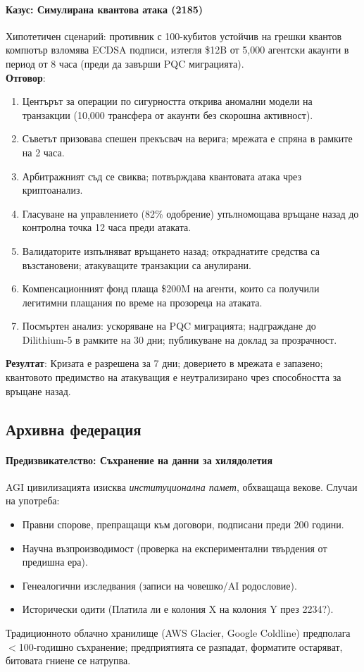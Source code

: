 \documentclass[11pt]{article}
\begin{document}
\paragraph{Казус: Симулирана квантова атака (2185)}
Хипотетичен сценарий: противник с 100-кубитов устойчив на грешки квантов компютър взломява ECDSA подписи, изтегля \$12B от 5,000 агентски акаунти в период от 8 часа (преди да завърши PQC миграцията).\\
\textbf{Отговор}:
\begin{enumerate}[noitemsep]
  \item Центърът за операции по сигурността открива аномални модели на транзакции (10,000 трансфера от акаунти без скорошна активност).
  \item Съветът призовава спешен прекъсвач на верига; мрежата е спряна в рамките на 2 часа.
  \item Арбитражният съд се свиква; потвърждава квантовата атака чрез криптоанализ.
  \item Гласуване на управлението (82\% одобрение) упълномощава връщане назад до контролна точка 12 часа преди атаката.
  \item Валидаторите изпълняват връщането назад; откраднатите средства са възстановени; атакуващите транзакции са анулирани.
  \item Компенсационният фонд плаща \$200M на агенти, които са получили легитимни плащания по време на прозореца на атаката.
  \item Посмъртен анализ: ускоряване на PQC миграцията; надграждане до Dilithium-5 в рамките на 30 дни; публикуване на доклад за прозрачност.
\end{enumerate}
\textbf{Резултат}: Кризата е разрешена за 7 дни; доверието в мрежата е запазено; квантовото предимство на атакуващия е неутрализирано чрез способността за връщане назад.

\subsection{Архивна федерация}

\paragraph{Предизвикателство: Съхранение на данни за хилядолетия}
AGI цивилизацията изисква \emph{институционална памет}, обхващаща векове. Случаи на употреба:
\begin{itemize}[noitemsep]
  \item Правни спорове, препращащи към договори, подписани преди 200 години.
  \item Научна възпроизводимост (проверка на експериментални твърдения от предишна ера).
  \item Генеалогични изследвания (записи на човешко/AI родословие).
  \item Исторически одити (Платила ли е колония X на колония Y през 2234?).
\end{itemize}
Традиционното облачно хранилище (AWS Glacier, Google Coldline) предполага $<$100-годишно съхранение; предприятията се разпадат, форматите остаряват, битовата гниене се натрупва.
\end{document}
